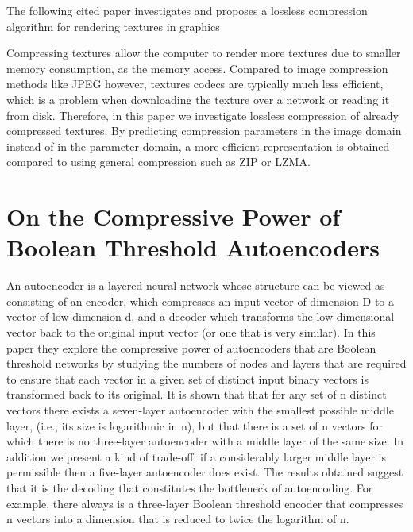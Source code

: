\documentclass{article}
\begin{document}
The following cited paper investigates and proposes a lossless compression algorithm for rendering textures in graphics

Compressing textures allow the computer to render more textures due to smaller memory consumption, as the memory access. Compared to image compression methods like JPEG however, textures codecs are typically much less efficient, which is a problem when downloading the texture over a network or reading it from disk. Therefore, in this paper we investigate lossless compression of already compressed textures. By predicting compression parameters in the image domain instead of in the parameter domain, a more efficient representation is obtained compared to using general compression such as ZIP or LZMA.



\section{On the Compressive Power of Boolean Threshold Autoencoders \cite{melkman2020compressive}}

An autoencoder is a layered neural network whose structure can be viewed as consisting of an encoder, which compresses an input vector of dimension D to a vector of low dimension d, and a decoder which transforms the low-dimensional vector back to the original input vector (or one that is very similar). In this paper they explore the compressive power of autoencoders that are Boolean threshold networks by studying the numbers of nodes and layers that are required to ensure that each vector in a given set of distinct input binary vectors is transformed back to its original\cite{ackley1985learning}. It is shown that that for any set of n distinct vectors there exists a seven-layer autoencoder with the smallest possible middle layer, (i.e., its size is logarithmic in n), but that there is a set of n vectors for which there is no three-layer autoencoder with a middle layer of the same size. In addition we present a kind of trade-off: if a considerably larger middle layer is permissible then a five-layer autoencoder does exist. The results obtained suggest that it is the decoding that constitutes the bottleneck of autoencoding. For example, there always is a three-layer Boolean threshold encoder that compresses n vectors into a dimension that is reduced to twice the logarithm of n.\cite{anderson1988neurocomputing} \cite{kingma2013auto} \cite{doersch2016tutorial}
\end{document}
